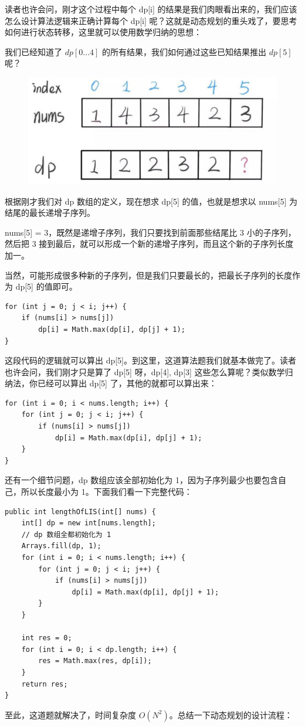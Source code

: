 \documentclass[12pt]{article}
\begin{document}
读者也许会问，刚才这个过程中每个 dp[i] 的结果是我们肉眼看出来的，我们应该怎么设计算法逻辑来正确计算每个 dp[i] 呢？这就是动态规划的重头戏了，要思考如何进行状态转移，这里就可以使用数学归纳的思想：

我们已经知道了 $dp[0...4]$ 的所有结果，我们如何通过这些已知结果推出 $dp[5]$ 呢？
\begin{figure}[H]
    \centering
    \includegraphics[width=.4\textwidth]{fig/Dynamic_Programming_Longest_Increasing Subsequence_5.png}
\end{figure}

根据刚才我们对 dp 数组的定义，现在想求 dp[5] 的值，也就是想求以 nums[5] 为结尾的最长递增子序列。

nums[5] = 3，既然是递增子序列，我们只要找到前面那些结尾比 3 小的子序列，然后把 3 接到最后，就可以形成一个新的递增子序列，而且这个新的子序列长度加一。

当然，可能形成很多种新的子序列，但是我们只要最长的，把最长子序列的长度作为 dp[5] 的值即可。
\begin{lstlisting}
for (int j = 0; j < i; j++) {
    if (nums[i] > nums[j]) 
        dp[i] = Math.max(dp[i], dp[j] + 1);
}
\end{lstlisting}

这段代码的逻辑就可以算出 dp[5]。到这里，这道算法题我们就基本做完了。读者也许会问，我们刚才只是算了 dp[5] 呀，dp[4], dp[3] 这些怎么算呢？类似数学归纳法，你已经可以算出 dp[5] 了，其他的就都可以算出来：
\begin{lstlisting}
for (int i = 0; i < nums.length; i++) {
    for (int j = 0; j < i; j++) {
        if (nums[i] > nums[j]) 
            dp[i] = Math.max(dp[i], dp[j] + 1);
    }
}
\end{lstlisting}

还有一个细节问题，dp 数组应该全部初始化为 1，因为子序列最少也要包含自己，所以长度最小为 1。下面我们看一下完整代码：
\begin{lstlisting}
public int lengthOfLIS(int[] nums) {
    int[] dp = new int[nums.length];
    // dp 数组全都初始化为 1
    Arrays.fill(dp, 1);
    for (int i = 0; i < nums.length; i++) {
        for (int j = 0; j < i; j++) {
            if (nums[i] > nums[j]) 
                dp[i] = Math.max(dp[i], dp[j] + 1);
        }
    }
    
    int res = 0;
    for (int i = 0; i < dp.length; i++) {
        res = Math.max(res, dp[i]);
    }
    return res;
}
\end{lstlisting}
至此，这道题就解决了，时间复杂度 $O(N^2)$。总结一下动态规划的设计流程：
\end{document}
